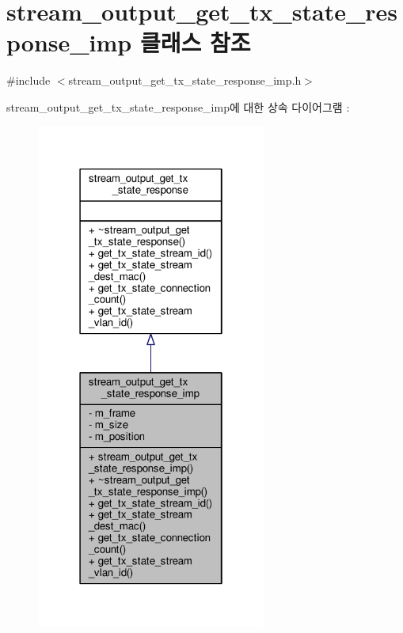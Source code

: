 \hypertarget{classavdecc__lib_1_1stream__output__get__tx__state__response__imp}{}\section{stream\+\_\+output\+\_\+get\+\_\+tx\+\_\+state\+\_\+response\+\_\+imp 클래스 참조}
\label{classavdecc__lib_1_1stream__output__get__tx__state__response__imp}


{\ttfamily \#include $<$stream\+\_\+output\+\_\+get\+\_\+tx\+\_\+state\+\_\+response\+\_\+imp.\+h$>$}



stream\+\_\+output\+\_\+get\+\_\+tx\+\_\+state\+\_\+response\+\_\+imp에 대한 상속 다이어그램 \+: 
\nopagebreak
\begin{figure}[H]
\begin{center}
\leavevmode
\includegraphics[width=214pt]{classavdecc__lib_1_1stream__output__get__tx__state__response__imp__inherit__graph}
\end{center}
\end{figure}


